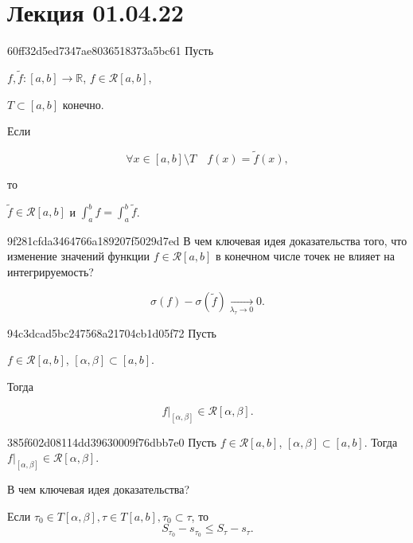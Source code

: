\section{Лекция 01.04.22}
\begin{note}{60ff32d5ed7347ae8036518373a5bc61}
    Пусть \begin{icloze}{3}\({ f, \tilde f : [a, b] \to \mathbb R }\),\: \({ f \in  \mathcal R[a, b] }\),\end{icloze}\: \begin{icloze}{4}\({ T \subset [a, b] }\) конечно.\end{icloze} Если
    \begin{icloze}{1}
        \[
            \forall x \in [a, b] \setminus T \quad f(x) = \tilde f(x),
        \]
    \end{icloze}
    то \begin{icloze}{2}\({ \tilde f \in \mathcal R[a, b] }\) и \({ \int_{a}^{b} f = \int_{a}^{b} \tilde f }\).\end{icloze}
\end{note}

\begin{note}{9f281cfda3464766a189207f5029d7ed}
    В чем ключевая идея доказательства того, что изменение значений функции \({ f \in\mathcal R[a, b] }\) в конечном числе точек не влияет на интегрируемость?

    \begin{cloze}{1}
        \[
            \sigma(f) - \sigma(\tilde f) \underset{\lambda_\tau \to 0}\longrightarrow 0.
        \]
    \end{cloze}
\end{note}

\begin{note}{94c3dcad5bc247568a21704cb1d05f72}
    Пусть \begin{icloze}{2}\({ f \in \mathcal R[a, b] }\), \({ [\alpha, \beta] \subset [a, b] }\).\end{icloze} Тогда
    \begin{icloze}{1}
        \[
            f |_{[\alpha, \beta]} \in \mathcal R[\alpha, \beta].
        \]
    \end{icloze}
\end{note}

\begin{note}{385f602d08114dd39630009f76dbb7e0}
    Пусть \({ f \in \mathcal R[a, b] }\), \({ [\alpha,  \beta]   \subset [a, b] }\). Тогда \({ f|_{[\alpha, \beta]} \in \mathcal R[\alpha, \beta] }\).

    В чем ключевая идея доказательства?

    \begin{cloze}{1}
        Если \({ \tau_0 \in T[\alpha, \beta], \tau \in T[a, b], \tau_0 \subset \tau }\), то
        \[
            S_{\tau_0} - s_{\tau_0} \leqslant S_{\tau} - s_{\tau}.
        \]
    \end{cloze}
\end{note}

